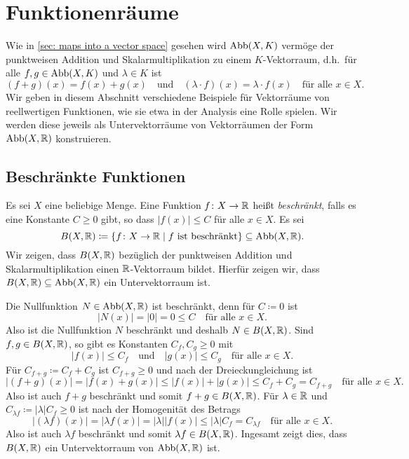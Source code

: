 \section{Funktionenräume}
Wie in \ref{sec: maps into a vector space} gesehen wird $\mathrm{Abb}(X,K)$ vermöge der punktweisen Addition und Skalarmultiplikation zu einem $K$-Vektorraum, d.h.\ für alle $f,g \in \mathrm{Abb}(X,K)$ und $\lambda \in K$ ist
\[
 (f+g)(x) = f(x)+g(x)
 \quad\text{und}\quad
 (\lambda \cdot f)(x) = \lambda \cdot f(x)
 \quad\text{für alle $x \in X$}.
\]
Wir geben in diesem Abschnitt verschiedene Beispiele für Vektorräume von reellwertigen Funktionen, wie sie etwa in der Analysis eine Rolle spielen. Wir werden diese jeweils als Untervektorräume von Vektorräumen der Form $\mathrm{Abb}(X,\mathbb{R})$ konstruieren.


\subsection{Beschränkte Funktionen}
Es sei $X$ eine beliebige Menge. Eine Funktion $f \colon X \to \mathbb{R}$ heißt \emph{beschränkt}, falls es eine Konstante $C \geq 0$ gibt, so dass $|f(x)| \leq C$ für alle $x \in X$. Es sei
\[
 B(X, \mathbb{R})
 \coloneqq \{f \colon X \to \mathbb{R} \mid \text{$f$ ist beschränkt}\}
 \subseteq \mathrm{Abb}(X,\mathbb{R}).
\]
Wir zeigen, dass $B(X,\mathbb{R})$ bezüglich der punktweisen Addition und Skalarmultiplikation einen $\mathbb{R}$-Vektorraum bildet. Hierfür zeigen wir, dass $B(X, \mathbb{R}) \subseteq \mathrm{Abb}(X,\mathbb{R})$ ein Untervektorraum ist.

Die Nullfunktion $N \in \mathrm{Abb}(X,\mathbb{R})$ ist beschränkt, denn für $C \coloneqq 0$ ist
\[
 |N(x)| = |0| = 0 \leq C 
 \quad\text{für alle $x \in X$}.
\]
Also ist die Nullfunktion $N$ beschränkt und deshalb $N \in B(X, \mathbb{R})$. Sind $f, g \in B(X, \mathbb{R})$, so gibt es Konstanten $C_f, C_g \geq 0$ mit
\[
 |f(x)| \leq C_f
 \quad\text{und}\quad
 |g(x)| \leq C_g
 \quad
 \text{für alle $x \in X$}.
\]
Für $C_{f+g} \coloneqq C_f + C_g$ ist $C_{f+g} \geq 0$ und nach der Dreieckungleichung ist
\[
 |(f+g)(x)|
 = |f(x) + g(x)|
 \leq |f(x)| + |g(x)|
 \leq C_f + C_g
 = C_{f+g}
 \quad
 \text{für alle $x \in X$}.
\]
Also ist auch $f+g$ beschränkt und somit $f+g \in B(X, \mathbb{R})$. Für $\lambda \in \mathbb{R}$ und $C_{\lambda f} \coloneqq |\lambda| C_f \geq 0$ ist nach der Homogenität des Betrags
\[
 |(\lambda f)(x)|
 = |\lambda f(x)|
 = |\lambda| |f(x)|
 \leq |\lambda| C_f
 = C_{\lambda f}
 \quad
 \text{für alle $x \in X$}.
\]
Also ist auch $\lambda f$ beschränkt und somit $\lambda f \in B(X,\mathbb{R})$. Ingesamt zeigt dies, dass $B(X,\mathbb{R})$ ein Untervektorraum von $\mathrm{Abb}(X,\mathbb{R})$ ist.


